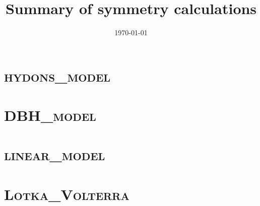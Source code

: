 \documentclass{book}
\begin{document}
\title{\textbf{Summary of symmetry calculations}}
\date{\today}
\maketitle
\tableofcontents
\clearpage
\chapter{\textsc{hydons\_model}}


\chapter{\textsc{DBH\_model}}


\chapter{\textsc{linear\_model}}


\chapter{\textsc{Lotka\_Volterra}}

\end{document}
